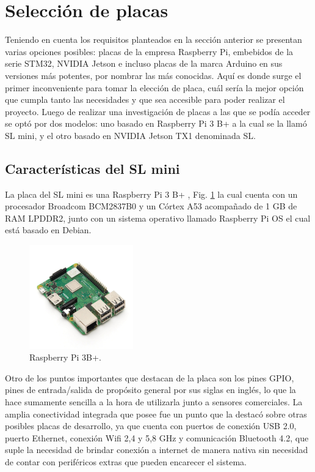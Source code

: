 \section{Selección de placas}

Teniendo en cuenta los requisitos planteados en la sección anterior se presentan varias opciones posibles:
placas de la empresa Raspberry Pi, embebidos de la serie STM32, NVIDIA Jetson e incluso placas de la marca Arduino en sus versiones más potentes, por nombrar las más conocidas.
Aquí es donde surge el primer inconveniente para tomar la elección de placa,
cuál sería la mejor opción que cumpla tanto las necesidades y que sea accesible para poder realizar el proyecto.
Luego de realizar una investigación de placas a las que se podía acceder se optó por dos modelos: uno basado en Raspberry Pi 3 B+ a la cual se la llamó SL mini, y el otro basado en NVIDIA Jetson TX1 denominada SL.

\subsection{Características del SL mini}

La placa del SL mini es una Raspberry Pi 3 B+ \cite{noauthor_documentacion_nodate-2}, Fig. \ref{fig:raspberry} la cual cuenta con un procesador
Broadcom BCM2837B0 y un Córtex A53 acompañado de 1 GB de RAM LPDDR2, junto con un sistema operativo llamado Raspberry Pi OS el cual está basado en Debian.

\begin{figure}[bth]
    \centering
    \includegraphics[width=0.4\textwidth]{imgs/Raspberry-pi3b+.jpg}
    \caption{Raspberry Pi 3B+.}
    \label{fig:raspberry}
\end{figure}

Otro de los puntos importantes que destacan de la placa son los pines GPIO, pines de entrada/salida de propósito general por sus siglas en inglés, lo que la hace sumamente sencilla a la hora de utilizarla junto a sensores comerciales.
La amplia conectividad integrada que posee fue un punto que la destacó sobre otras posibles placas de desarrollo, ya que cuenta con puertos de conexión USB 2.0, puerto Ethernet, conexión Wifi 2,4 y 5,8 GHz y comunicación Bluetooth 4.2, que suple la necesidad de brindar conexión a internet de manera nativa sin necesidad de contar con periféricos extras que pueden encarecer el sistema.

